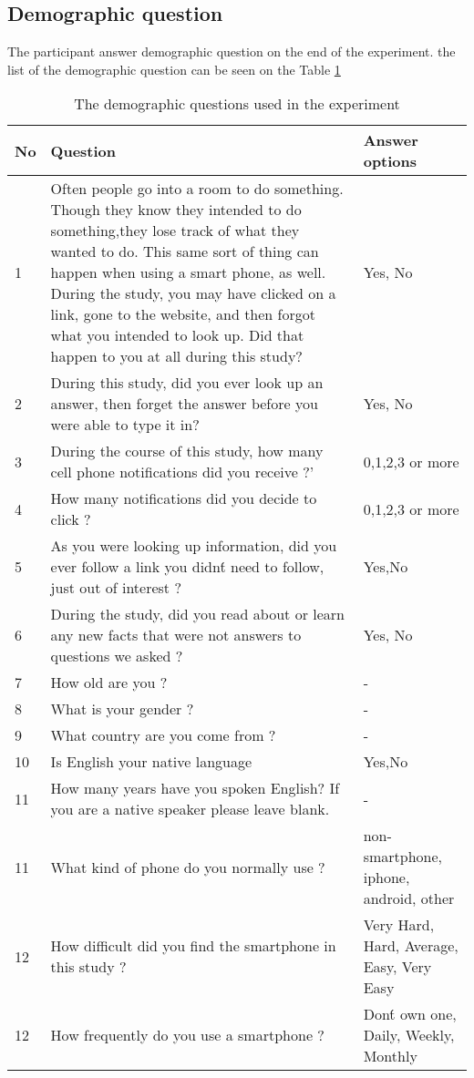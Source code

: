 \subsection{Demographic question}
The participant answer demographic question on the end of the experiment.
the list of the demographic question can be seen on the Table \ref{tab:demographicQuestion}

\begin{table}[!h]
  \centering
\begin{longtable}{ |p{0.5cm}|>{\hspace{0pt}}p{5.5cm}|p{7cm}  }
 \hline
 No& Question & Answer options \\
 \hline
 1 & Often people go into a room to do something.  Though they know they intended to do something,they lose track of what they wanted to do. This same sort of thing can happen when using a smart phone, as well.  During the study, you may have clicked on a link, gone to the website, and then forgot what you intended to look up.  Did that happen to you at all during this study?  & Yes, No\\
 2 & During this study, did you ever look up an answer, then forget the answer before you were able to type it in? & Yes, No\\
 3 & During the course of this study, how many cell phone notifications did you receive ?' & 0,1,2,3 or more\\
 4 & How many notifications did you decide to click ? & 0,1,2,3 or more \\
 5 & As you were looking up information, did you ever follow a link you didn\'t need to follow, just out of interest ? & Yes,No \\
 6 &  During the study, did you read about or learn any new facts that were not answers to questions we asked ? & Yes, No \\
 7 & How old are you ? & - \\
 8 & What is your gender ? & -\\
 9 & What country are you come from ? &  - \\
10 & Is English your native language  & Yes,No\\
11 & How many years have you spoken English? If you are a native speaker please leave blank.  & -\\
11 & What kind of phone do you normally use ?  & non-smartphone, iphone, android, other\\
12 & How difficult did you find the smartphone in this study ?  & Very Hard, Hard, Average, Easy, Very Easy\\
12 & How frequently do you use a smartphone ?  & Don\'t own one, Daily, Weekly, Monthly\\

 \hline
\end{longtable}
 \caption{The demographic questions used in the experiment}
 \label{tab:demographicQuestion}
\end{table}

